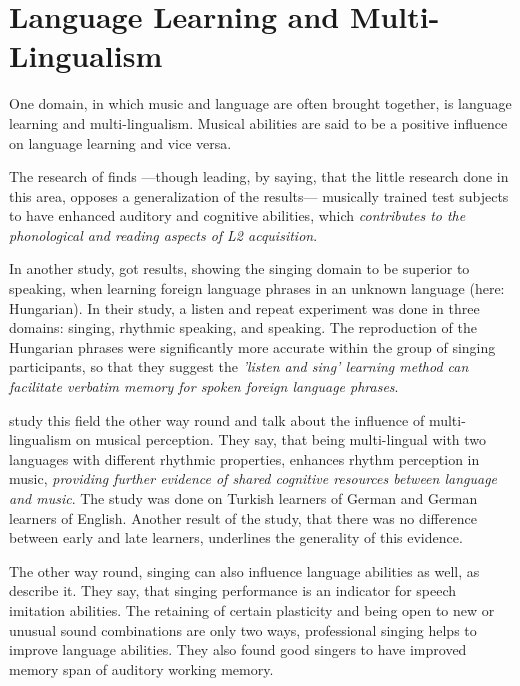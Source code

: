\section{Language Learning and Multi-Lingualism}
\label{Language Learning and Multi-Lingualism}

One domain, in which music and language are often brought together, is language learning and multi-lingualism. Musical abilities are said to be a positive influence on language learning and vice versa.

The research of \cite{zeromskaite2014potential} finds ---though leading, by saying, that the little research done in this area, opposes a generalization of the results--- musically trained test subjects to have enhanced auditory and cognitive abilities, which \textit{contributes to the phonological and reading aspects of L2 acquisition}. 

In another study, \cite{ludke2014singing} got results, showing the singing domain to be superior to speaking, when learning foreign language phrases in an unknown language (here: Hungarian). In their study, a listen and repeat experiment was done in three domains: singing, rhythmic speaking, and speaking. The reproduction of the Hungarian phrases were significantly more accurate within the group of singing participants, so that they suggest the \textit{'listen and sing' learning method can facilitate verbatim memory for spoken foreign language phrases}.

\cite{roncaglia2016mastering} study this field the other way round and talk about the influence of multi-lingualism on musical perception. They say, that being multi-lingual with two languages with different rhythmic properties, enhances rhythm perception in music, \textit{providing further evidence of shared cognitive resources between language and music}. The study was done on Turkish learners of German and German learners of English. Another result of the study, that there was no difference between early and late learners, underlines the generality of this evidence.

The other way round, singing can also influence language abilities as well, as  \cite[abstract]{christiner2013song} describe it. They say, that singing performance is an indicator for speech imitation abilities. The retaining of certain plasticity and being open to new or unusual sound combinations are only two ways, professional singing helps to improve language abilities. They also found good singers to have improved memory span of auditory working memory.








